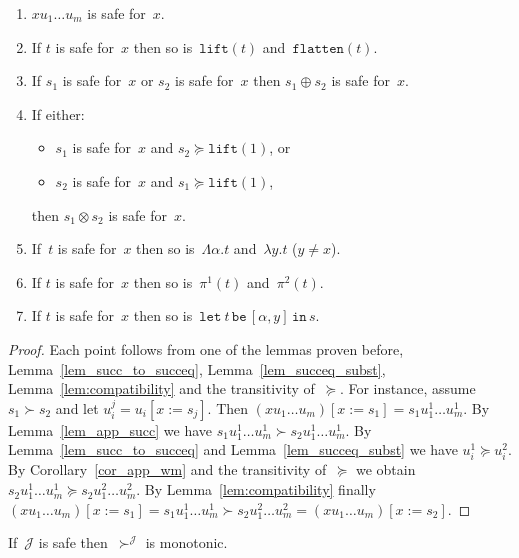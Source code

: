\documentclass[a4paper,UKenglish,cleveref,autoref,numberwithinsect]{lipics-v2019}
\theoremstyle{definition}
\newcommand{\subst}[2]{#1:=#2}
\newcommand{\abs}[2]{\lambda #1.#2}
\newcommand{\tabs}[2]{\Lambda #1.#2}
\newcommand{\flatten}{\mathtt{flatten}}
\newcommand{\lift}{\mathtt{lift}}
\newcommand{\Termmap}{\mathcal{J}}
\newcommand{\succinterpret}{\succ^{\Termmap}}
\newcommand{\xlet}[4]{\mathtt{let}_{#1}\,#2\,\mathtt{be}\,[#3]\,\mathtt{in}\,#4}
\begin{document}
\begin{lemma}\label{lem_safe}
  \begin{enumerate}
  \item $x u_1 \ldots u_m$ is safe for~$x$.
  \item If $t$ is safe for~$x$ then so is~$\lift(t)$
    and~$\flatten(t)$.
  \item If $s_1$ is safe for~$x$ or $s_2$ is safe for~$x$ then $s_1
    \oplus s_2$ is safe for~$x$.
  \item If either:
    \begin{itemize}
    \item $s_1$ is safe for~$x$ and $s_2 \succeq \lift(1)$, or
    \item $s_2$ is safe for~$x$ and $s_1 \succeq \lift(1)$,
    \end{itemize}
    then $s_1 \otimes s_2$ is safe for~$x$.
  \item If~$t$ is safe for~$x$ then so is~$\tabs{\alpha}{t}$
    and~$\abs{y}{t}$ ($y \ne x$).
  \item If $t$ is safe for~$x$ then so is~$\pi^1(t)$ and~$\pi^2(t)$.
  \item If $t$ is safe for~$x$ then so is~$\xlet{}{t}{\alpha,y}{s}$.
  \end{enumerate}
\end{lemma}

\begin{proof}
  Each point follows from one of the lemmas proven before,
  Lemma~\ref{lem_succ_to_succeq}, Lemma~\ref{lem_succeq_subst},
  Lemma~\ref{lem:compatibility} and the transitivity of~$\succeq$. For
  instance, assume $s_1 \succ s_2$ and let
  $u_i^j=u_i[\subst{x}{s_j}]$. Then $(x u_1 \ldots
  u_m)[\subst{x}{s_1}] = s_1 u_1^1 \ldots u_m^1$. By
  Lemma~\ref{lem_app_succ} we have $s_1 u_1^1 \ldots u_m^1 \succ s_2
  u_1^1 \ldots u_m^1$. By Lemma~\ref{lem_succ_to_succeq} and
  Lemma~\ref{lem_succeq_subst} we have $u_i^1 \succeq u_i^2$. By
  Corollary~\ref{cor_app_wm} and the transitivity of~$\succeq$ we
  obtain $s_2 u_1^1 \ldots u_m^1 \succeq s_2 u_1^2 \ldots u_m^2$. By
  Lemma~\ref{lem:compatibility} finally $(x u_1 \ldots
  u_m)[\subst{x}{s_1}] = s_1 u_1^1 \ldots u_m^1 \succ s_2 u_1^2 \ldots
  u_m^2 = (x u_1 \ldots u_m)[\subst{x}{s_2}]$.
\end{proof}

\begin{lemma}\label{lem_succinterpret_monotonic}
  If~$\Termmap$ is safe then~$\succinterpret$ is monotonic.
\end{lemma}
\end{document}
